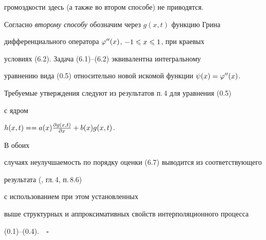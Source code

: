 громоздкости здесь (а также во втором способе) не приводятся.





Согласно {\it второму способу} обозначим через $g(x,t)$ функцию Грина 


дифференциального оператора $\varphi''(x)$, $-1\leqslant x\leqslant 1$, при краевых 


условиях (6.2). Задача (6.1)--(6.2) эквивалентна интегральному 


уравнению вида (0.5) относительно новой искомой функции $\psi(x)=\varphi''(x)$. 


Требуемые утверждения следуют из результатов п.\,4 для уравнения (0.5) 


с ядром


$h(x,t)=\linebreak =a(x)\frac{\partial g(x,t)}{\partial x}+b(x)g(x,t)$. 







В обоих 


случаях неулучшаемость по порядку оценки (6.7) выводится из соответствующего 


результата (\cite{3}, гл.\,4, п.\,8.6)


с использованием при этом установленных 


выше структурных и аппроксимативных свойств интерполяционного процесса 


(0.1)--(0.4).$\quad\square$








